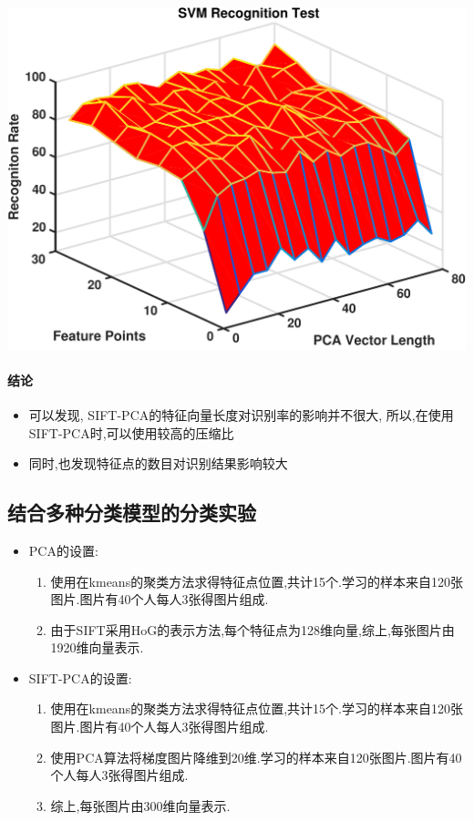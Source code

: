 		\begin{center}
		\begin{minipage}[t]{\linewidth}
		\center
		{
		\includegraphics[width=\textwidth]{Img/c3/sift_pca_iter} 
		}
		\end{minipage}
		\medskip
		\end{center}

\paragraph{结论}

\begin{itemize}
	\item 可以发现, SIFT-PCA的特征向量长度对识别率的影响并不很大, 所以,在使用SIFT-PCA时,可以使用较高的压缩比
	\item 同时,也发现特征点的数目对识别结果影响较大
\end{itemize}

\subsection{结合多种分类模型的分类实验}
\begin{itemize}
	\item PCA的设置:
		\begin{enumerate}
			\item 使用在kmeans的聚类方法求得特征点位置,共计15个.学习的样本来自120张图片.图片有40个人每人3张得图片组成.
			\item 由于SIFT采用HoG的表示方法,每个特征点为128维向量,综上,每张图片由1920维向量表示.
		\end{enumerate}
	\item SIFT-PCA的设置:
		\begin{enumerate}
			\item 使用在kmeans的聚类方法求得特征点位置,共计15个.学习的样本来自120张图片.图片有40个人每人3张得图片组成.
			\item 使用PCA算法将梯度图片降维到20维.学习的样本来自120张图片.图片有40个人每人3张得图片组成.
			\item 综上,每张图片由300维向量表示.
		\end{enumerate}
\end{itemize}

